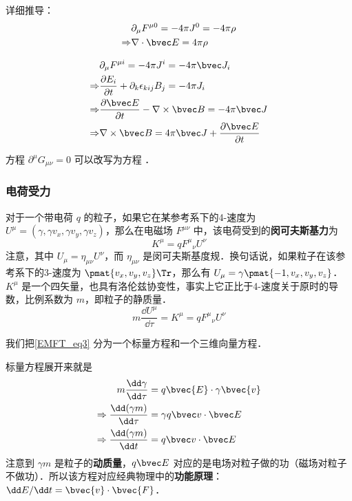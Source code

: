 详细推导：
\begin{equation}
\begin{aligned}
&\partial_\mu F^{\mu 0}=-4\pi J^0=-4\pi \rho\\
\Rightarrow &\nabla \cdot \bvec E=4\pi \rho 
\end{aligned}
\end{equation}

\begin{equation}
\begin{aligned}
&\partial_\mu F^{\mu i}=-4\pi J^i=-4\pi \bvec J_i\\
\Rightarrow & \frac{\partial E_i}{\partial t} +\partial_k\epsilon_{kij}B_j=-4\pi J_i\\
\Rightarrow &\frac{\partial \bvec E}{\partial t}-\nabla\times \bvec B=-4\pi \bvec J\\
\Rightarrow &\nabla\times \bvec B=4\pi \bvec J+\frac{\partial \bvec E}{\partial t}
\end{aligned}
\end{equation}

方程 $\partial^\mu G_{\mu\nu}=0$ 可以改写为方程 ．

\subsubsection{电荷受力}

对于一个带电荷 $q$ 的粒子，如果它在某参考系下的4-速度为 $U^\mu=(\gamma,\gamma v_x,\gamma v_y,\gamma v_z)$，那么在电磁场 $F^{\mu\nu}$ 中，该电荷受到的\textbf{闵可夫斯基力}为
\begin{equation}
K^{\mu}=q {F^{\mu}}_\nu U^\nu
\end{equation}
注意，其中 $U_\mu=\eta_{\mu\nu}U^\nu$，而 $\eta_{\mu\nu}$ 是闵可夫斯基度规．换句话说，如果粒子在该参考系下的3-速度为 $\pmat{v_x, v_y, v_z}\Tr$，那么有 $U_\mu=\gamma\pmat{-1, v_x, v_y, v_z}$．$K^\mu$ 是一个四矢量，也具有洛伦兹协变性，事实上它正比于4-速度关于原时的导数，比例系数为 $m$，即粒子的静质量．
\begin{equation}\label{EMFT_eq3}
m\frac{\dd U^\mu}{\dd \tau}=K^\mu=q {F^{\mu}}_\nu U^\nu
\end{equation}

我们把\autoref{EMFT_eq3} 分为一个标量方程和一个三维向量方程．

标量方程展开来就是
\begin{equation}
\begin{aligned}
m\frac{\dd \gamma}{\dd\tau}&=q \bvec{E}\cdot \gamma\bvec{v}\\
\Rightarrow\frac{\dd (\gamma m)}{\dd \tau}&=\gamma q \bvec v\cdot \bvec E\\
\Rightarrow \frac{\dd (\gamma m)}{\dd t}&=q\bvec v\cdot \bvec E
\end{aligned}
\end{equation}
注意到 $\gamma m$ 是粒子的\textbf{动质量}，$q \bvec E$ 对应的是电场对粒子做的功（磁场对粒子不做功）．所以该方程对应经典物理中的\textbf{功能原理}：$\dd E/\dd t=\bvec{v}\cdot\bvec{F}$．

